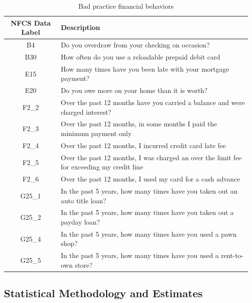 \documentclass[12pt]{article}
\renewcommand{\arraystretch}{0.7}
\theoremstyle{plain}
\begin{document}
\begin{table}[H]
\centering
\caption{Bad practice financial behaviors}
\renewcommand{\arraystretch}{1}
\begin{tabular}{|c|p{13.3cm}|} 

 \hline
\textbf{NFCS Data Label} & \textbf{Description}\\ [0.5ex] 
 \hline \hline
B4 &	Do you overdraw from your checking on occasion?\\
\hline
B30 &	How often do you use a reloadable prepaid debit card\\
\hline
E15 &	How many times have you been late with your mortgage payment?\\
\hline
E20 &	Do you owe more on your home than it is worth?\\
\hline
F2\_2 &	Over the past 12 months have you carried a balance and were charged interest?\\
\hline
F2\_3 &	Over the past 12 months, in some months I paid the minimum payment only\\
\hline
F2\_4 &	Over the past 12 months, I incurred  credit card late fee\\
\hline
F2\_5 &	Over the past 12 months, I was charged an over the limit fee for exceeding my credit line\\
\hline
F2\_6 &	Over the past 12 months, I used my card for a cash advance\\
\hline
G25\_1 &	In the past 5 years, how many times have you taken out an auto title loan?\\
\hline
G25\_2 &	In the past 5 years, how many times have you taken out a payday loan?\\
\hline
G25\_4 &	In the past 5 years, how many times have you used a pawn shop?\\
\hline
G25\_5 &	In the past 5 years, how many times have you used a rent-to-own store?\\
\hline
\end{tabular}
\label{tab:bad}
\end{table}

\subsection{Statistical Methodology and Estimates} \label{statmethods}
\end{document}
